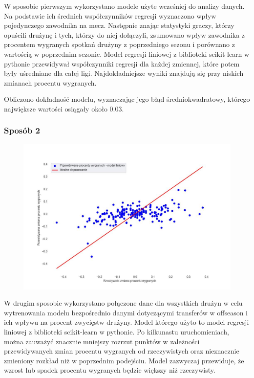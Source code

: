 \documentclass{article}
\begin{document}
W sposobie pierwszym wykorzystano modele użyte wcześniej do analizy danych. Na podstawie ich średnich współczynników regresji wyznaczono wpływ pojedynczego zawodnika na mecz. Następnie znając statystyki graczy, którzy opuścili drużynę i tych, którzy do niej dołączyli, zsumowano wpływ zawodnika z procentem wygranych spotkań drużyny z poprzedniego sezonu i porównano z wartością w poprzednim sezonie. Model regresji liniowej z biblioteki scikit-learn w pythonie przewidywał współczynniki regresji dla każdej zmiennej, które potem były uśredniane dla całej ligi. Najdokładniejsze wyniki znajdują się przy niskich zmianach procentu wygranych.

Obliczono dokładność modelu, wyznaczając jego błąd średniokwadratowy, którego największe wartości osiągały około 0.03. 
\newpage

\subsubsection{Sposób 2}
\begin{figure}[htp]
    \centering
    \includegraphics[width=16cm]{linear_model_merged.jpg}
    \label{fig:linear_model_merged}
\end{figure}

W drugim sposobie wykorzystano połączone dane dla wszystkich drużyn w celu wytrenowania modelu bezpośrednio danymi dotyczącymi transferów w offseason i ich wpływu na procent zwycięstw drużyny. Model którego użyto to model regresji liniowej z biblioteki scikit-learn w pythonie. Po kilkunastu uruchomieniach, można zauważyć znacznie mniejszy rozrzut punktów w zależności przewidywanych zmian procentu wygranych od rzeczywistych oraz nieznacznie zmieniony rozkład niż w poprzednim podejściu. Model zazwyczaj przewiduje, że wzrost lub spadek procentu wygranych będzie większy niż rzeczywisty.
\end{document}
